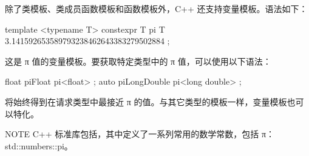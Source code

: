 
除了类模板、类成员函数模板和函数模板外，C++ 还支持变量模板。语法如下：

\begin{cpp}
template <typename T>
constexpr T pi { T { 3.141592653589793238462643383279502884 } };
\end{cpp}

这是 π 值的变量模板。要获取特定类型中的 π 值，可以使用以下语法：

\begin{cpp}
float piFloat { pi<float> };
auto piLongDouble { pi<long double> };
\end{cpp}

将始终得到在请求类型中最接近 π 的值。与其它类型的模板一样，变量模板也可以特化。

\begin{myNotic}{NOTE}
C++ 标准库包括，其中定义了一系列常用的数学常数，包括 π：std::numbers::pi。
\end{myNotic}














